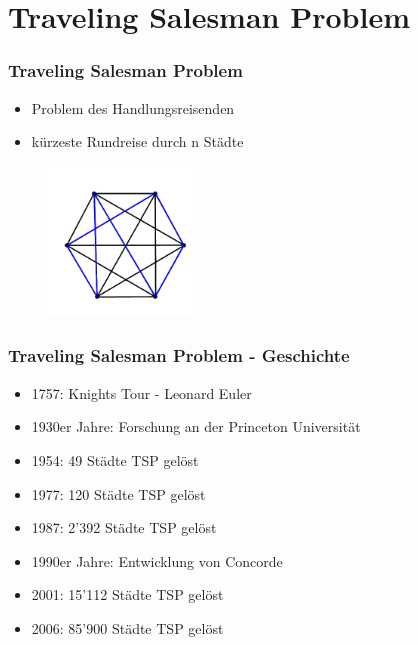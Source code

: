 \documentclass[12pt]{beamer}
\begin{document}
    \section{Traveling Salesman Problem}
    \begin{frame}
        \frametitle{Traveling Salesman Problem}
	    \begin{itemize}
                \item Problem des Handlungsreisenden
                \item kürzeste Rundreise durch n Städte
            \end{itemize}

            \begin{figure}[H]
                \centering
                \includegraphics[width=4cm]{gfx/simple_tsp}
            \end{figure}
    \end{frame}
    \begin{frame}
        \frametitle{Traveling Salesman Problem - Geschichte}
	    \begin{itemize}
                \item 1757: Knights Tour - Leonard Euler
                \item 1930er Jahre: Forschung an der Princeton Universität
                \item 1954: 49 Städte TSP gelöst 
                \item 1977: 120 Städte TSP gelöst 
                \item 1987: 2'392 Städte TSP gelöst 
                \item 1990er Jahre: Entwicklung von Concorde
                \item 2001: 15'112 Städte TSP gelöst
                \item 2006: 85'900 Städte TSP gelöst
            \end{itemize}
    \end{frame}
\end{document}
